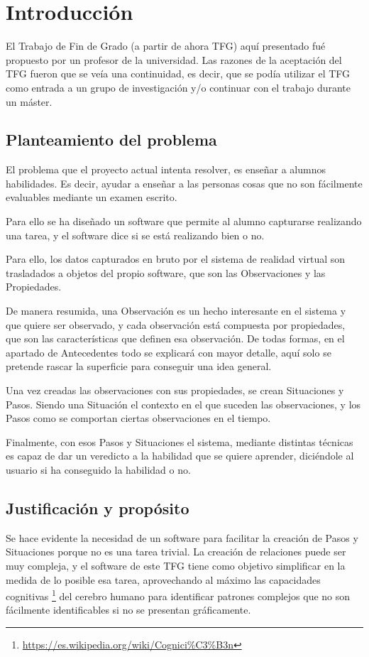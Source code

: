 \chapter{Introducci\'{o}n} 
El Trabajo de Fin de Grado (a partir de ahora TFG) aqu\'{i} presentado fu\'{e} propuesto por un profesor de la universidad.
Las razones de la aceptaci\'{o}n del TFG fueron que se ve\'{i}a una continuidad, es decir, que se pod\'{i}a 
utilizar el TFG como entrada a un grupo de investigaci\'{o}n y/o continuar con el trabajo durante un m\'{a}ster.

\section{Planteamiento del problema}
El problema que el proyecto actual intenta resolver, es ense\~nar a alumnos habilidades. Es decir, ayudar a 
ense\~nar a las personas cosas que no son f\'acilmente evaluables mediante un examen escrito.

Para ello se ha dise\~nado un software que permite al alumno capturarse realizando una tarea, y el
software dice si se est\'a realizando bien o no.

Para ello, los datos capturados en bruto por el sistema de realidad virtual son trasladados a objetos del propio software,
que son las Observaciones y las Propiedades.

De manera resumida, una Observaci\'on es un hecho interesante en el sistema y que quiere ser observado, y cada observaci\'on
est\'a compuesta por propiedades, que son las caracter\'isticas que definen esa observaci\'on. De todas formas, en el 
apartado de Antecedentes todo se explicar\'a con mayor detalle, aqu\'i solo se pretende rascar la superficie para 
conseguir una idea general.

Una vez creadas las observaciones con sus propiedades, se crean Situaciones y Pasos. Siendo una Situaci\'on el contexto
en el que suceden las observaciones, y los Pasos como se comportan ciertas observaciones en el tiempo.

Finalmente, con esos Pasos y Situaciones el sistema, mediante distintas t\'ecnicas es capaz de dar un veredicto
a la habilidad que se quiere aprender, dici\'endole al usuario si ha conseguido la habilidad o no.

\section{Justificaci\'{o}n y prop\'osito}
Se hace evidente la necesidad de un software para facilitar la creaci\'on de Pasos y Situaciones porque
no es una tarea trivial. La creaci\'on de relaciones puede ser muy compleja, y el software de este TFG
tiene como objetivo simplificar en la medida de lo posible esa tarea, aprovechando al m\'aximo las capacidades
cognitivas \footnote{\url{https://es.wikipedia.org/wiki/Cognici\%C3\%B3n}} del cerebro humano para identificar
patrones complejos que no son f\'acilmente identificables si no se presentan gr\'aficamente.

